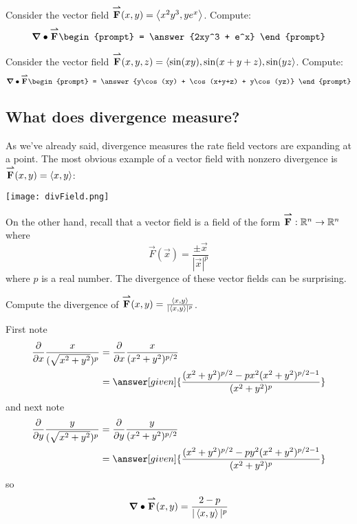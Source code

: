 \documentclass{ximera}
\begin{document}
\begin{question}
  Consider the vector field ${\overset{\boldsymbol{\rightharpoonup}}{\mathbf{F}}}(x,y) =
  \left\langle x^2y^3,ye^x\right\rangle$. Compute:
  \[
  \divergence\vec{F}
  \begin{prompt}
    = \answer{2xy^3 + e^x}
  \end{prompt}
  \]
  \begin{question}
    Consider the vector field ${\overset{\boldsymbol{\rightharpoonup}}{\mathbf{F}}}(x,y,z) =
    \left\langle \sin(xy),\sin(x+y+z),\sin(yz\right\rangle$. Compute:
    \[
    \divergence\vec{F}
    \begin{prompt}
    = \answer{y\cos(xy) + \cos(x+y+z) + y\cos(yz)}
    \end{prompt}
    \]
  \end{question}
\end{question}

\subsection{What does divergence measure?}

As we've already said, divergence measures the rate field vectors are
expanding at a point. The most obvious example of a vector field with
nonzero divergence is ${\overset{\boldsymbol{\rightharpoonup}}{\mathbf{F}}}(x,y)= \left\langle x,y\right\rangle$:
\begin{image}
  \texttt{[image: divField.png]}
\end{image}
On the other hand, recall that a  vector field is a field
of the form ${\overset{\boldsymbol{\rightharpoonup}}{\mathbf{F}}}:\mathbb R^n\to\mathbb R^n$ where
\[
\vec{F}(\vec{x}) = \frac{\pm\vec{x}}{|\vec{x}|^p}
\]
where $p$ is a real number. The divergence of these vector fields can
be surprising.

\begin{example}
  Compute the divergence of ${\overset{\boldsymbol{\rightharpoonup}}{\mathbf{F}}}(x,y) =\frac{\left\langle x,y\right\rangle}{|\left\langle x,y\right\rangle|^p}$.
    \begin{explanation}
      First note
      \begin{align*}
        \pp{x} \frac{x}{(\sqrt{x^2+y^2})^p} &= \pp{x} \frac{x}{(x^2+y^2)^{p/2}} \\
        &= \answer[given]{\frac{(x^2+y^2)^{p/2}-px^2 (x^2+y^2)^{p/2-1}}{(x^2+y^2)^p}}
      \end{align*}
      and next note
      \begin{align*}
        \pp{y} \frac{y}{(\sqrt{x^2+y^2})^p} &= \pp{y} \frac{y}{(x^2+y^2)^{p/2}} \\
        &= \answer[given]{\frac{(x^2+y^2)^{p/2}-py^2 (x^2+y^2)^{p/2-1}}{(x^2+y^2)^p}}
      \end{align*}
      so
      \begin{align*}
        \boldsymbol\nabla\bullet{\overset{\boldsymbol{\rightharpoonup}}{\mathbf{F}}}(x,y) = \frac{2-p}{|\left\langle x,y\right\rangle|^p}
      \end{align*}
    \end{explanation}
\end{example}
\end{document}
